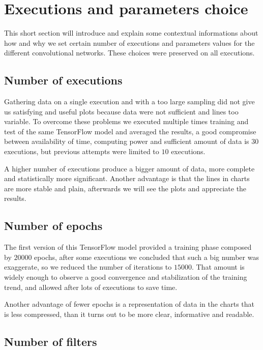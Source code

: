 \section{Executions and parameters choice}

This short section will introduce and explain some contextual informations about how and why we set certain number of executions and parameters values for the different convolutional networks. These choices were preserved on all executions.

\subsection{Number of executions}

Gathering data on a single execution and with a too large sampling did not give us satisfying and useful plots because data were not sufficient and lines too variable. To overcome these problems we executed multiple times training and test of the same TensorFlow model and averaged the results, a good compromise between availability of time, computing power and sufficient amount of data is $30$ executions, but previous attempts were limited to $10$ executions.

A higher number of executions produce a bigger amount of data, more complete and statistically more significant. Another advantage is that the lines in charts are more stable and plain, afterwards we will see the plots and appreciate the results.

\subsection{Number of epochs}

The first version of this TensorFlow model provided a training phase composed by $20000$ epochs, after some executions we concluded that such a big number was exaggerate, so we reduced the number of iterations to $15000$. That amount is widely enough to observe a good convergence and stabilization of the training trend, and allowed after lots of executions to save time.

Another advantage of fewer epochs is a representation of data in the charts that is less compressed, than it turns out to be more clear, informative and readable.

\subsection{Number of filters}

